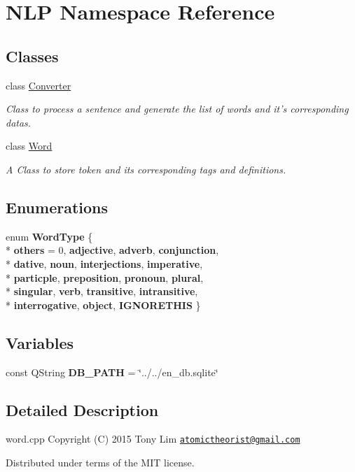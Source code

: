 \hypertarget{namespaceNLP}{\section{N\-L\-P Namespace Reference}
\label{namespaceNLP}
}
\subsection*{Classes}
\begin{DoxyCompactItemize}
\item 
class \hyperlink{classNLP_1_1Converter}{Converter}
\begin{DoxyCompactList}\small\item\em Class to process a sentence and generate the list of words and it's corresponding datas. \end{DoxyCompactList}\item 
class \hyperlink{classNLP_1_1Word}{Word}
\begin{DoxyCompactList}\small\item\em A Class to store token and its corresponding tags and definitions. \end{DoxyCompactList}\end{DoxyCompactItemize}
\subsection*{Enumerations}
\begin{DoxyCompactItemize}
\item 
enum {\bfseries Word\-Type} \{ \\*
{\bfseries others} = 0, 
{\bfseries adjective}, 
{\bfseries adverb}, 
{\bfseries conjunction}, 
\\*
{\bfseries dative}, 
{\bfseries noun}, 
{\bfseries interjections}, 
{\bfseries imperative}, 
\\*
{\bfseries particple}, 
{\bfseries preposition}, 
{\bfseries pronoun}, 
{\bfseries plural}, 
\\*
{\bfseries singular}, 
{\bfseries verb}, 
{\bfseries transitive}, 
{\bfseries intransitive}, 
\\*
{\bfseries interrogative}, 
{\bfseries object}, 
{\bfseries I\-G\-N\-O\-R\-E\-T\-H\-I\-S}
 \}
\end{DoxyCompactItemize}
\subsection*{Variables}
\begin{DoxyCompactItemize}
\item 
\hypertarget{namespaceNLP_a2a777e12096928b1e7d904b6d6484556}{const Q\-String {\bfseries D\-B\-\_\-\-P\-A\-T\-H} = \char`\"{}../../en\-\_\-db.\-sqlite\char`\"{}}\label{namespaceNLP_a2a777e12096928b1e7d904b6d6484556}

\end{DoxyCompactItemize}


\subsection{Detailed Description}
word.\-cpp Copyright (C) 2015 Tony Lim \href{mailto:atomictheorist@gmail.com}{\tt atomictheorist@gmail.\-com}

Distributed under terms of the M\-I\-T license. 